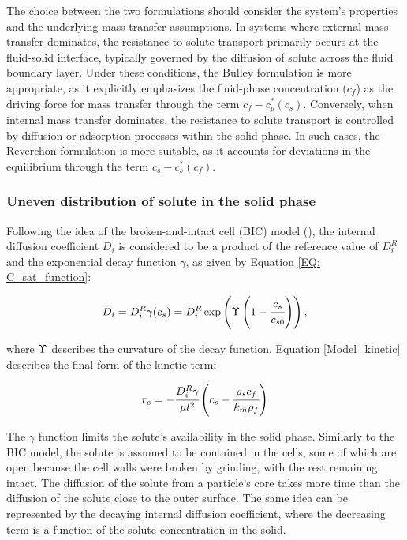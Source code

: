\documentclass[a4paper,fleqn]{cas-dc}
\begin{document}
	{\color{blue}The choice between the two formulations should consider the system's properties and the underlying mass transfer assumptions. In systems where external mass transfer dominates, the resistance to solute transport primarily occurs at the fluid-solid interface, typically governed by the diffusion of solute across the fluid boundary layer. Under these conditions, the Bulley formulation is more appropriate, as it explicitly emphasizes the fluid-phase concentration ($c_f$) as the driving force for mass transfer through the term $c_f - c_p^*(c_s)$. Conversely, when internal mass transfer dominates, the resistance to solute transport is controlled by diffusion or adsorption processes within the solid phase. In such cases, the Reverchon formulation is more suitable, as it accounts for deviations in the equilibrium through the term $c_s - c_s^*(c_f)$.}
	
	\subsubsection{Uneven distribution of solute in the solid phase} \label{CH: Gamma_Function}
	
	Following the idea of the broken-and-intact cell (BIC) model (\citet{Sovova2017}), the internal diffusion coefficient $D_i$ is considered to be a product of the reference value of $D_i^R$ and the exponential decay function $\gamma$, as given by Equation \ref{EQ: C_sat_function}:
	
	{\footnotesize
		\begin{equation}
			D_i = D_i^R \gamma(c_s) = D_i^R \exp \left( \Upsilon \left( 1-\cfrac{ c_s }{c_{s0}} \right) \right), \label{EQ: C_sat_function}
	\end{equation} }
	
	where  ${\color{black}\Upsilon}$ describes the curvature of the decay function. Equation \ref{Model_kinetic} describes the final form of the kinetic term:
	
	{\footnotesize
		\begin{equation}
			\label{Model_kinetic}
			r_e = -\cfrac{D_i^R \gamma }{ \mu l^2 } \left( c_s  - \cfrac{\rho_s c_f }{ k_m \rho_f }  \right)
	\end{equation} }
	
	The $\gamma$ function limits the solute's availability in the solid phase. Similarly to the BIC model, the solute is assumed to be contained in the cells, some of which are open because the cell walls were broken by grinding, with the rest remaining intact. The diffusion of the solute from a particle's core takes more time than the diffusion of the solute close to the outer surface. The same idea can be represented by the decaying internal diffusion coefficient, where the decreasing term is a function of the solute concentration in the solid. 
	
\end{document}
